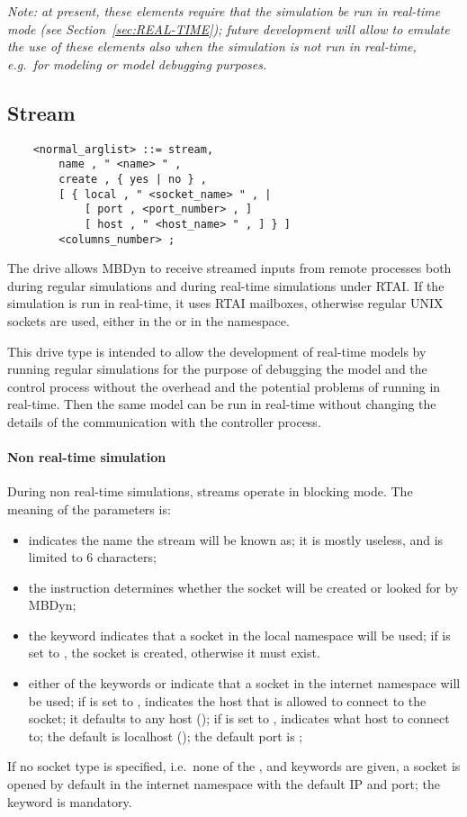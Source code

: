 \emph{Note: at present, these elements require that the simulation
be run in real-time mode (see Section~\ref{sec:REAL-TIME});
future development will allow to emulate the use of these elements
also when the simulation is not run in real-time, e.g.\ for modeling
or model debugging purposes.}



\subsection{Stream}\label{sec:Stream}
\begin{verbatim}
    <normal_arglist> ::= stream,
        name , " <name> " ,
        create , { yes | no } ,
        [ { local , " <socket_name> " , |
            [ port , <port_number> , ]
            [ host , " <host_name> " , ] } ]
        <columns_number> ;
\end{verbatim}
The  drive allows MBDyn to receive streamed inputs 
from remote processes both during regular simulations and during 
real-time simulations under RTAI.
If the simulation is run in real-time, it uses RTAI mailboxes, 
otherwise regular UNIX sockets are used, either in the  or 
in the  namespace.

This drive type is intended to allow the development of real-time models
by running regular simulations for the purpose of debugging the model
and the control process without the overhead and the potential problems
of running in real-time.
Then the same model can be run in real-time without changing the details
of the communication with the controller process.

\paragraph{Non real-time simulation}
During non real-time simulations, streams operate in blocking mode.
The meaning of the parameters is:
\begin{itemize}
\item {} indicates the name the stream
will be known as; it is mostly useless, and is limited to 6 characters;
\item the instruction  determines whether the socket will be
created or looked for by MBDyn;
\item the keyword  indicates that a socket 
in the local namespace will be used; if  is set to ,
the socket is created, otherwise it must exist.
\item either of the keywords  or  indicate that a socket
in the internet namespace will be used;
if  is set to ,  indicates 
the host that is allowed to connect to the socket; it defaults 
to any host (); if  is set to ,
 indicates what host to connect to; the default 
is localhost (); the default port is ;
\end{itemize}
If no socket type is specified, i.e.\ none of the ,  
and  keywords are given, a socket is opened by default 
in the internet namespace with the default IP and port; the 
keyword is mandatory.

